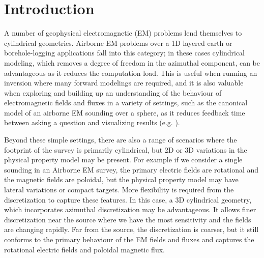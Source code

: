 \documentclass[preprint,review,3p,times,onecolumn,authoryear]{elsarticle}
\begin{document}

\section{Introduction}
\label{sec:intro}

A number of geophysical electromagnetic (EM) problems lend themselves to cylindrical geometries. Airborne EM problems over a 1D layered earth or borehole-logging applications fall into this category; in these cases cylindrical modeling, which removes a degree of freedom in the azimuthal component, can be advantageous as it reduces the computation load. This is useful when running an inversion where many forward modelings are required, and it  is also valuable when exploring and building up an understanding of the behaviour of electromagnetic fields and fluxes in a variety of settings, such as the canonical model of an airborne EM sounding over a sphere, as it reduces feedback time between asking a question and visualizing results (e.g. \cite{Oldenburg2017}).

Beyond these simple settings, there are also a range of scenarios where the footprint of the survey is primarily cylindrical, but 2D or 3D variations in the physical property model may be present. For example if we consider a single sounding in an Airborne EM survey, the primary electric fields are rotational and the magnetic fields are poloidal, but the physical property model may have lateral variations or compact targets. More flexibility is required from the discretization to capture these features. In this case, a 3D cylindrical geometry, which incorporates azimuthal discretization may be advantageous. It allows finer discretization near the source where we have the most sensitivity and the fields are changing rapidly. Far from the source, the discretization is coarser, but it still conforms to the primary behaviour of the EM fields and fluxes and captures the rotational electric fields and poloidal magnetic flux.
\end{document}
